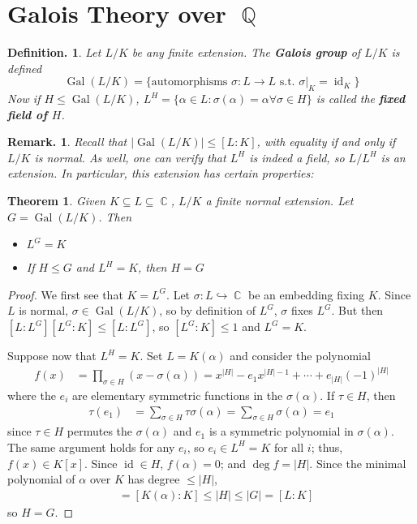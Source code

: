 \documentclass[11pt, a4paper]{memoir}
\DeclareMathOperator{\Q}{{\mathbb{Q}}}
\DeclareMathOperator{\C}{{\mathbb{C}}}
\theoremstyle{change}
\newtheorem{theorem}{Theorem}[section]
\theoremstyle{plain}
\theoremstyle{nonumberplain}
\newtheorem{definition}{Definition.}
\newtheorem{remark}{Remark.}
\newtheorem{proof}{Proof}
\DeclareMathOperator{\Gal}{Gal}
\DeclareMathOperator{\id}{id}
\begin{document}
\section{Galois Theory over \texorpdfstring{$\Q$}{Q}}
\begin{definition}
    Let $L/K$ be any finite extension.
    The \textbf{Galois group} of $L/K$ is defined
    \begin{equation*}
        \Gal(L/K)=\{\text{automorphisms }\sigma:L\to L\text{ s.t. }\sigma|_K=\id_K\}
    \end{equation*}
    Now if $H\leq\Gal(L/K)$, $L^H=\{\alpha\in L:\sigma(\alpha)=\alpha\forall\sigma\in H\}$ is called the \textbf{fixed field of $H$}.
\end{definition}
\begin{remark}
    Recall that $|\Gal(L/K)|\leq[L:K]$, with equality if and only if $L/K$ is normal.
    As well, one can verify that $L^H$ is indeed a field, so $L/L^H$ is an extension.
    In particular, this extension has certain properties:
\end{remark}
\begin{theorem}\label{thm:galfix}
    Given $K\subseteq L\subseteq\C$, $L/K$ a finite normal extension.
    Let $G=\Gal(L/K)$.
    Then
    \begin{itemize}[nolistsep]
        \item $L^G=K$
        \item If $H\leq G$ and $L^H=K$, then $H=G$
    \end{itemize}
\end{theorem}
\begin{proof}
    We first see that $K=L^G$.
    Let $\sigma:L\hookrightarrow\C$ be an embedding fixing $K$.
    Since $L$ is normal, $\sigma\in\Gal(L/K)$, so by definition of $L^G$, $\sigma$ fixes $L^G$.
    But then $[L:L^G][L^G:K]\leq[L:L^G]$, so $[L^G:K]\leq 1$ and $L^G=K$.

    Suppose now that $L^H=K$.
    Set $L=K(\alpha)$ and consider the polynomial
    \begin{align*}
        f(x) &= \prod_{\sigma\in H}(x-\sigma(\alpha))= x^{|H|}-e_1x^{|H|-1}+\cdots+e_{|H|}(-1)^{|H|}
    \end{align*}
    where the $e_i$ are elementary symmetric functions in the $\sigma(\alpha)$.
    If $\tau\in H$, then
    \begin{align*}
        \tau(e_1)&=\sum\limits_{\sigma\in H}\tau\sigma(\alpha)= \sum\limits_{\sigma\in H}\sigma(\alpha)=e_1
    \end{align*}
    since $\tau\in H$ permutes the $\sigma(\alpha)$ and $e_1$ is a symmetric polynomial in $\sigma(\alpha)$.
    The same argument holds for any $e_i$, so $e_i\in L^H=K$ for all $i$; thus, $f(x)\in K[x]$.
    Since $\id\in H$, $f(\alpha)=0$; and $\deg f=|H|$.
    Since the minimal polynomial of $\alpha$ over $K$ has degree $\leq|H|$,
    \begin{align*}
        [L:K] &= [K(\alpha):K]\leq|H|\leq|G|=[L:K]
    \end{align*}
    so $H=G$.
\end{proof}
\end{document}
